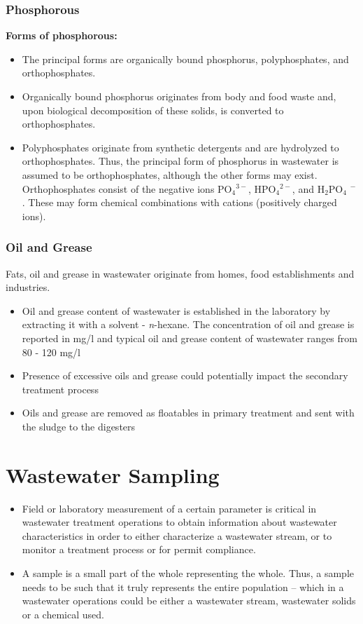 		\subsubsection{Phosphorous}			
		\textbf{Forms of phosphorous:}\\
					      \begin{itemize}
					      	\item The principal forms are organically bound phosphorus, polyphosphates, and orthophosphates.
					      	\item Organically bound phosphorus originates from body and food waste and, upon biological decomposition of these solids, is converted to orthophosphates. 
					      	\item Polyphosphates originate from synthetic detergents and are hydrolyzed to orthophosphates. Thus, the principal form of phosphorus in wastewater is assumed to be orthophosphates, although the other forms may exist. Orthophosphates consist of the negative ions PO$_4$$^{3-}$, HPO$_4$$^{2-}$, and H$_2$PO$_4$ $^-$.  These may form chemical combinations with cations (positively charged ions).
					      \end{itemize}

\subsubsection{Oil and Grease}	
			Fats, oil and grease in wastewater originate from homes, food establishments and industries.
			\begin{itemize}
				\item Oil and grease content of wastewater is established in the laboratory by extracting it with a solvent - \textit{n}-hexane.  The concentration of oil and grease is reported in mg/l and typical oil and grease content of wastewater ranges from 80 - 120 mg/l
				\item Presence of excessive oils and grease could potentially impact the secondary treatment process
				\item Oils and grease are removed as floatables in primary treatment and sent with the sludge to the digesters
			\end{itemize}
\newpage	
\section{Wastewater Sampling}		
		\begin{itemize}
			\item Field or laboratory measurement of a certain parameter is critical in wastewater treatment operations to obtain information about wastewater characteristics in order to either characterize a wastewater stream, or to monitor a treatment process or for permit compliance.  
			\item A sample is a small part of the whole representing the whole.  Thus, a sample needs to be such that it truly represents the entire population – which in a wastewater operations could be either a wastewater stream, wastewater solids or a chemical used.
		\end{itemize}
		
